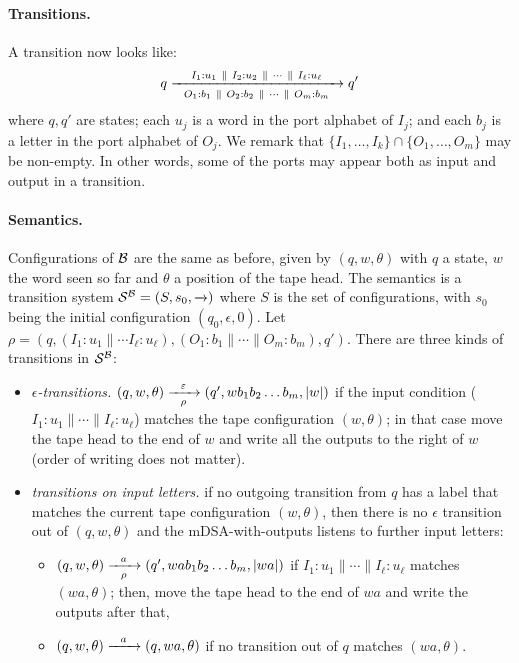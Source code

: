 \paragraph*{Transitions.} A transition now looks like:
\begin{align*}
q \xrightarrow[~~O_1: b_1 ~\parallel~ O_2: b_2 ~\parallel~ \cdots ~\parallel~ O_m: b_m~~]{I_1: u_1 ~\parallel~ I_2: u_2 ~\parallel~ \cdots ~\parallel~ I_\ell: u_\ell} q'
\end{align*}
where $q, q'$ are states; each $u_j$ is a word in the port alphabet of $I_j$; and each $b_j$ is a letter in the port alphabet of $O_j$. We remark that $\{I_1, \dots, I_k\} \cap \{O_1, \dots, O_m\}$ may be non-empty. In other words, some of the ports may appear both as input and output in a transition.  

\paragraph*{Semantics.} Configurations of $\mathcal{B}$ are the same as before, given by $(q, w, \theta)$ with $q$ a state, $w$ the word seen so far and $\theta$ a position of the tape head. The semantics is a transition system $\mathcal{S}^{\mathcal{B}} = (S, s_0, \xrightarrow{})$ where $S$ is the set of configurations, with $s_0$ being the initial configuration $(q_0, \epsilon, 0)$. Let $\rho = (q, (I_1: u_1 \parallel \cdots I_\ell:u_\ell), (O_1: b_1 \parallel \cdots \parallel O_m: b_m), q')$. There are three kinds of transitions in $\mathcal{S}^{\mathcal{B}}$:
\begin{itemize}
\item \emph{$\epsilon$-transitions.} $(q, w, \theta) \xrightarrow[\rho]{~~\varepsilon~~} (q', wb_1 b_2 \dots b_m, |w|)$ if the input condition ($I_1:u_1 \parallel \cdots \parallel I_\ell:u_\ell$) matches the tape configuration $(w, \theta)$; in that case move the tape head to the end of $w$ and write all the outputs to the right of $w$ (order of writing does not matter).
\item \emph{transitions on input letters.} if no outgoing transition from $q$ has a label that  matches the current tape configuration $(w, \theta)$, then there is no $\epsilon$ transition out of $(q, w, \theta)$ and the mDSA-with-outputs listens to further input letters: 
\begin{itemize}
\item $(q, w, \theta) \xrightarrow[\rho]{~~a~~} (q', wab_1 b_2 \dots b_m, |wa|)$ if $I_1:u_1 \parallel \cdots \parallel I_\ell:u_\ell$ matches $(wa, \theta)$; then, move the tape head to the end of $wa$ and write the outputs after that,
\item $(q, w, \theta) \xrightarrow{~~a~~} (q, wa, \theta)$ if no transition out of $q$ matches $(wa, \theta)$.
\end{itemize}
\end{itemize} 

